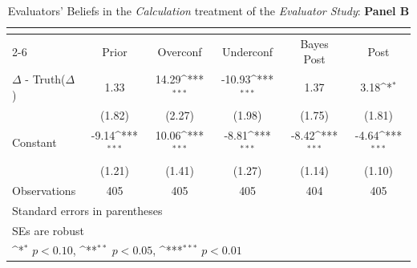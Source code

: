 \begin{table}[htbp]\centering
\def\sym#1{\ifmmode^{#1}\else\(^{#1}\)\fi}
\caption{Evaluators' Beliefs in the \textit{Calculation} treatment of the \textit{Evaluator Study}: \textbf{Panel B}}
\begin{tabular}{l*{5}{c}}
\hline\hline
                &\multicolumn{5}{c}{}                                                                          \\\cmidrule(lr){2-6}
                &\multicolumn{1}{c}{Prior}&\multicolumn{1}{c}{Overconf}&\multicolumn{1}{c}{Underconf}&\multicolumn{1}{c}{Bayes Post}&\multicolumn{1}{c}{Post}\\
\hline
$\Delta$ - Truth($\Delta$)&     1.33         &    14.29\sym{***}&   -10.93\sym{***}&     1.37         &     3.18\sym{*}  \\
                &   (1.82)         &   (2.27)         &   (1.98)         &   (1.75)         &   (1.81)         \\
Constant        &    -9.14\sym{***}&    10.06\sym{***}&    -8.81\sym{***}&    -8.42\sym{***}&    -4.64\sym{***}\\
                &   (1.21)         &   (1.41)         &   (1.27)         &   (1.14)         &   (1.10)         \\
\hline
Observations    &      405         &      405         &      405         &      404         &      405         \\
\hline\hline
\multicolumn{6}{l}{\footnotesize Standard errors in parentheses}\\
\multicolumn{6}{l}{\footnotesize SEs are robust}\\
\multicolumn{6}{l}{\footnotesize \sym{*} \(p<0.10\), \sym{**} \(p<0.05\), \sym{***} \(p<0.01\)}\\
\end{tabular}
\end{table}
